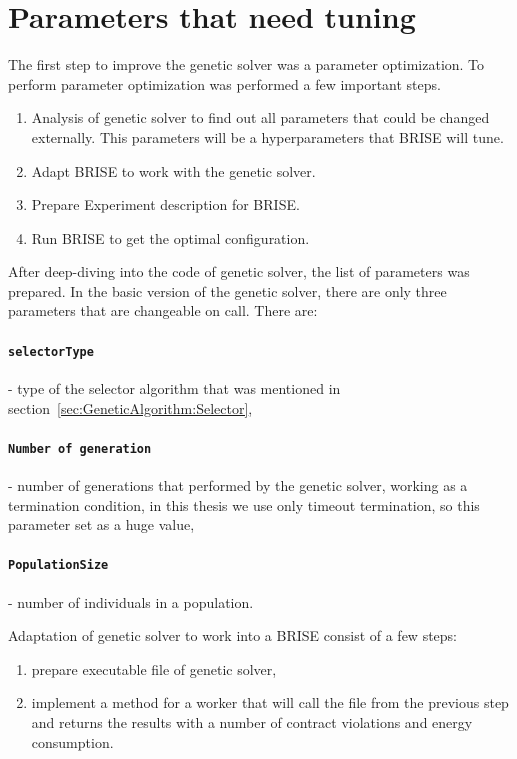 \section{Parameters that need tuning}
The first step to improve the genetic solver was a parameter optimization. To perform parameter optimization was performed a few important steps.
\begin{enumerate}
	\item Analysis of genetic solver to find out all parameters that could be changed externally. This parameters will be a hyperparameters that BRISE will tune.
	\item Adapt BRISE to work with the genetic solver.
	\item Prepare Experiment description for BRISE.
	\item Run BRISE to get the optimal configuration.
\end{enumerate}

After deep-diving into the code of genetic solver, the list of parameters was prepared.
In the basic version of the genetic solver, there are only three parameters that are changeable on call. There are:
	\paragraph{\texttt{selectorType}} - type of the selector algorithm that was mentioned in section~\ref{sec:GeneticAlgorithm:Selector},
	\paragraph{\texttt{Number of generation}} - number of generations that performed by the genetic solver, working as a termination condition, in this thesis we use only timeout termination, so this parameter set as a huge value,
	\paragraph{\texttt{PopulationSize}} - number of individuals in a population.

Adaptation of genetic solver to work into a BRISE consist of a few steps:
\begin{enumerate}
	\item prepare executable file of genetic solver,
	\item implement a method for a worker that will call the file from the previous step and returns the results with a number of contract violations and energy consumption.
\end{enumerate}

